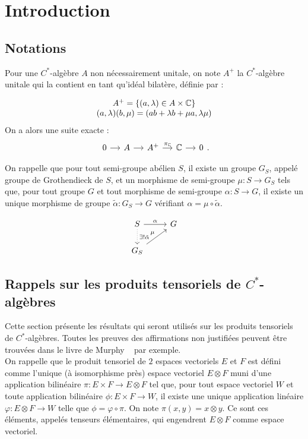 \section{Introduction}
\subsection{Notations}

Pour une $C^*$-algèbre $A$ non nécessairement unitale, on note $A^+$ la $C^*$-algèbre unitale qui la contient en tant qu'idéal bilatère, définie par :

\[\begin{array}{c}A^+=\{(a,\lambda)\in A\times \mathbb C \} \\ (a,\lambda)(b,\mu)=(ab+\lambda b +\mu a,\lambda\mu)\end{array}\]
 On a alors une suite exacte :
\[\begin{tikzcd}[column sep = small] 0 \arrow{r} &  A \arrow{r} & A^+ \arrow{r}{\pi_\C} & \C \arrow{r} & 0 \end{tikzcd}.\]

On rappelle que pour tout semi-groupe abélien $S$, il existe un groupe $G_S$, appelé groupe de Grothendieck de $S$, et un morphisme de semi-groupe $\mu : S\rightarrow G_S$ tels que, pour tout groupe $G$ et tout morphisme de semi-groupe $\alpha : S\rightarrow G$, il existe un unique morphisme de groupe $\tilde \alpha : G_S \rightarrow G$ vérifiant $\alpha = \mu \circ \tilde\alpha$. 

\[\begin{tikzcd} S \arrow{r}{\alpha} \arrow[dotted]{d}{\exists !\tilde\alpha}& G \\
	G_S \arrow{ur}{\mu} & \end{tikzcd}\]
 
\subsection{Rappels sur les produits tensoriels de $C^*$-algèbres}

Cette section présente les résultats qui seront utilisés sur les produits tensoriels de $C^*$-algèbres. Toutes les preuves des affirmations non justifiées peuvent être trouvées dans le livre de Murphy ~\cite{Murphy} par exemple.\\

On rappelle que le produit tensoriel de $2$ espaces vectoriels $E$ et $F$ est défini comme l'unique (à isomorphisme près) espace vectoriel $E\otimes F$ muni d'une application bilinéaire $\pi : E\times F \rightarrow E\otimes F$ tel que, pour tout espace vectoriel $W$ et toute application bilinéaire $\phi : E \times F \rightarrow W $, il existe une unique application linéaire $\varphi :E\otimes F \rightarrow W$ telle que $\phi = \varphi\circ \pi$. On note $\pi(x,y)=x\otimes y$. Ce sont ces éléments, appelés tenseurs élémentaires, qui engendrent $E\otimes F$ comme espace vectoriel.\\ 

